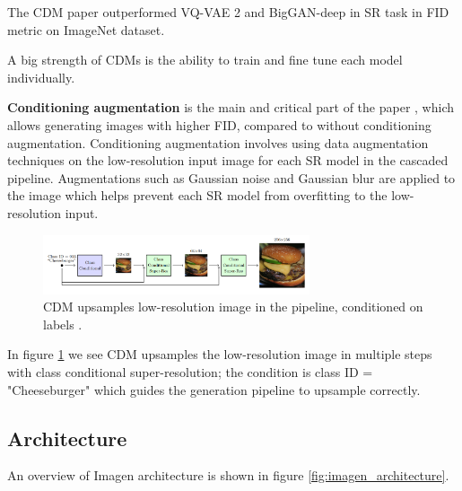 The CDM paper \cite{cascaded_diffusion_models} outperformed VQ-VAE 2 \cite{vqvae2} and BigGAN-deep \cite{biggan_deep} in SR task in FID metric on ImageNet dataset.

A big strength of CDMs is the ability to train and fine tune each model individually.

\textbf{Conditioning augmentation} is the main and critical part of the paper \cite{cascaded_diffusion_models}, which allows generating images with higher FID, compared to without conditioning augmentation. Conditioning augmentation involves using data augmentation techniques on the low-resolution input image for each SR model in the cascaded pipeline. Augmentations such as Gaussian noise and Gaussian blur are applied to the image which helps prevent each SR model from overfitting to the low-resolution input.

\begin{figure}
    \centering
    \includegraphics[width=0.7\textwidth]{images/imagen/cdm_architecture.png}
    \caption{CDM upsamples low-resolution image in the pipeline, conditioned on labels \cite{cascaded_diffusion_models}.}
    \label{fig:imagen_cdm_architecture}
\end{figure}

In figure \ref{fig:imagen_cdm_architecture} we see CDM upsamples the low-resolution image in multiple steps with class conditional super-resolution; the condition is class ID = "Cheeseburger" which guides the generation pipeline to upsample correctly.























\subsection{Architecture}

An overview of Imagen architecture is shown in figure \ref{fig:imagen_architecture}.

